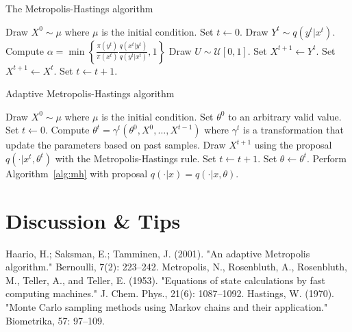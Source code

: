 \documentclass[12pt,preprint]{aastex}
\newcommand{\sectlabel}[1]{\label{sect:#1}}
\begin{document}
\begin{algorithm}
\caption{The Metropolis-Hastings algorithm}
\label{alg:mh}
\begin{algorithmic}[1]

  \STATE Draw $X^0\sim\mu$ where $\mu$ is the initial condition.
  \STATE Set $t\leftarrow0$.
  \REPEAT
    \STATE Draw $Y^t\sim q(y^t|x^t)$.
    \STATE Compute $\alpha = \min\left\{
      \frac{\pi(y^t)}{\pi(x^t)}\frac{q(x^t|y^t)}{q(y^t|x^t)}, 1\right\}$
    \STATE Draw $U\sim\mathcal{U}[0,1]$.
      \STATE Set $X^{t+1}\leftarrow Y^t$.
    \ELSE
      \STATE Set $X^{t+1}\leftarrow X^t$.
    \ENDIF
    \STATE Set $t\leftarrow t+1$.

\end{algorithmic}
\end{algorithm}

\begin{algorithm}
\caption{Adaptive Metropolis-Hastings algorithm}
\label{alg:adaptive_mh}
\begin{algorithmic}
  \STATE Draw $X^0\sim\mu$ where $\mu$ is the initial condition.
  \STATE Set $\theta^0$ to an arbitrary valid value.
  \STATE Set $t\leftarrow0$.
  \REPEAT
      \STATE Compute $\theta^t = \gamma^t(\theta^0,X^0,\dots,X^{t-1})$ where
      $\gamma^t$ is a transformation that update the parameters based on past
      samples.
      \STATE Draw $X^{t + 1}$ using the proposal $q(\cdot|x^t,\theta^t)$ with
      the Metropolis-Hastings rule.
      \STATE Set $t\leftarrow t+1$.
  \STATE Set $\theta\leftarrow\theta^t$.
  \STATE Perform Algorithm~\ref{alg:mh} with proposal $q(\cdot|x) =
  q(\cdot|x,\theta)$.
\end{algorithmic}
\end{algorithm}

\section{Discussion \& Tips}\sectlabel{advice}

\begin{thebibliography}{}\raggedright
{}
    Haario, H.; Saksman, E.; Tamminen, J. (2001). "An adaptive Metropolis algorithm." Bernoulli, 7(2): 223–242.
    Metropolis, N., Rosenbluth, A., Rosenbluth, M., Teller, A., and Teller, E. (1953). "Equations of state calculations by fast computing machines." J. Chem. Phys., 21(6): 1087–1092.
    Hastings, W. (1970). "Monte Carlo sampling methods using Markov chains and their application." Biometrika, 57: 97–109.
\end{thebibliography}
\end{document}
